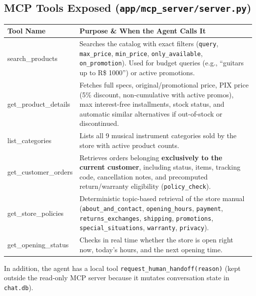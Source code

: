 \documentclass[11pt,a4paper]{article}
\begin{document}
\subsection{MCP Tools Exposed (\texttt{app/mcp\_server/server.py})}

\begin{tabularx}{\textwidth}{>{\ttfamily\footnotesize\raggedright\arraybackslash}p{3.6cm} >{\raggedright\arraybackslash}X}
\toprule
\textbf{\normalfont\bfseries Tool Name} & \textbf{Purpose \& When the Agent Calls It} \\
\midrule
search\_products & Searches the catalog with exact filters (\texttt{query}, \texttt{max\_price}, \texttt{min\_price}, \texttt{only\_available}, \texttt{on\_promotion}). Used for budget queries (e.g., ``guitars up to R\$ 1000'') or active promotions. \\
\addlinespace[2pt]
get\_product\_details & Fetches full specs, original/promotional price, PIX price (5\% discount, non-cumulative with active promos), max interest-free installments, stock status, and automatic similar alternatives if out-of-stock or discontinued. \\
\addlinespace[2pt]
list\_categories & Lists all 9 musical instrument categories sold by the store with active product counts. \\
\addlinespace[2pt]
get\_customer\_orders & Retrieves orders belonging \textbf{exclusively to the current customer}, including status, items, tracking code, cancellation notes, and precomputed return/warranty eligibility (\texttt{policy\_check}). \\
\addlinespace[2pt]
get\_store\_policies & Deterministic topic-based retrieval of the store manual (\texttt{about\_and\_contact}, \texttt{opening\_hours}, \texttt{payment}, \texttt{returns\_exchanges}, \texttt{shipping}, \texttt{promotions}, \texttt{special\_situations}, \texttt{warranty}, \texttt{privacy}). \\
\addlinespace[2pt]
get\_opening\_status & Checks in real time whether the store is open right now, today's hours, and the next opening time. \\
\bottomrule
\end{tabularx}

In addition, the agent has a local tool \texttt{request\_human\_handoff(reason)} (kept outside the read-only MCP server because it mutates conversation state in \texttt{chat.db}).
\end{document}
